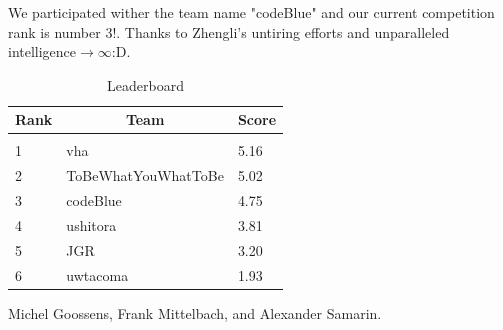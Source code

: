 \documentclass[letterpaper]{article}
\begin{document}
We participated wither the team name "codeBlue" and our current competition rank is number 3!. \cite{hr}Thanks to Zhengli's untiring efforts and unparalleled intelligence$\longrightarrow\infty$:D. 

\begin{table}[h]
	\caption{Leaderboard}
	\label{sample-table}
	\begin{center}
		\begin{tabular}{lll}
			\multicolumn{1}{c}{\bf Rank} & \multicolumn{1}{c}{\bf Team} & \multicolumn{1}{c}{\bf Score} \\
			\hline \\
			1                            & vha                          & 5.16                          \\
			2                            & ToBeWhatYouWhatToBe          & 5.02                          \\
			3                            & codeBlue                     & 4.75                          \\
			4                            & ushitora                     & 3.81                          \\
			5                            & JGR                          & 3.20                          \\
			6                            & uwtacoma                     & 1.93                          \\
		\end{tabular}
	\end{center}
\end{table}

\newpage



\begin{thebibliography}{9}

Michel Goossens, Frank Mittelbach, and Alexander Samarin. 


\end{thebibliography}
\end{document}
